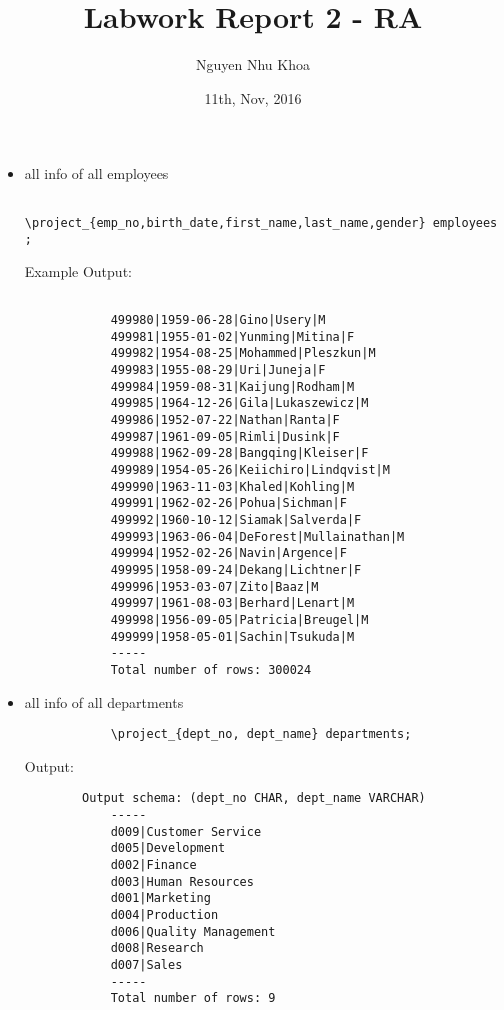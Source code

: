 \documentclass[12pt, letterpaper, twoside]{article}
\title{Labwork Report 2 - RA}
\author{Nguyen Nhu Khoa}
\date{11th, Nov, 2016}
\begin{document}
	\begin{itemize}
		\item all info of all employees
		\begin{verbatim}
			\project_{emp_no,birth_date,first_name,last_name,gender} employees ;
		\end{verbatim}
		\quad Example Output:
		 \begin{verbatim}
		 
			499980|1959-06-28|Gino|Usery|M
			499981|1955-01-02|Yunming|Mitina|F
			499982|1954-08-25|Mohammed|Pleszkun|M
			499983|1955-08-29|Uri|Juneja|F
			499984|1959-08-31|Kaijung|Rodham|M
			499985|1964-12-26|Gila|Lukaszewicz|M
			499986|1952-07-22|Nathan|Ranta|F
			499987|1961-09-05|Rimli|Dusink|F
			499988|1962-09-28|Bangqing|Kleiser|F
			499989|1954-05-26|Keiichiro|Lindqvist|M
			499990|1963-11-03|Khaled|Kohling|M
			499991|1962-02-26|Pohua|Sichman|F
			499992|1960-10-12|Siamak|Salverda|F
			499993|1963-06-04|DeForest|Mullainathan|M
			499994|1952-02-26|Navin|Argence|F
			499995|1958-09-24|Dekang|Lichtner|F
			499996|1953-03-07|Zito|Baaz|M
			499997|1961-08-03|Berhard|Lenart|M
			499998|1956-09-05|Patricia|Breugel|M
			499999|1958-05-01|Sachin|Tsukuda|M
			-----
			Total number of rows: 300024

		\end{verbatim}
	\end{itemize}

	\newpage
	
	\begin{itemize}
		\item all info of all departments
		\begin{verbatim}
			\project_{dept_no, dept_name} departments;	
		\end{verbatim}
		\quad Output:
		\begin{verbatim}
		Output schema: (dept_no CHAR, dept_name VARCHAR)
			-----
			d009|Customer Service
			d005|Development
			d002|Finance
			d003|Human Resources
			d001|Marketing
			d004|Production
			d006|Quality Management
			d008|Research
			d007|Sales
			-----
			Total number of rows: 9
		\end{verbatim}
	\end{itemize}
	
\end{document}
